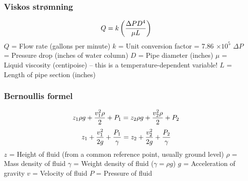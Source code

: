\documentclass{beamer}
\begin{document}
\begin{frame}
	\frametitle{Viskos strømning}

	


%
%
$$Q = k \left({{\Delta P D^4} \over {\mu L}}\right)$$
%
%
$Q$ = Flow rate (gallons per minute)
%
$k$ = Unit conversion factor = 7.86 $\times 10^5$
%
$\Delta P$ = Pressure drop (inches of water column)
%
$D$ = Pipe diameter (inches)
%
$\mu$ = Liquid viscosity (centipoise) -- this is a temperature-dependent variable!
%
$L$ = Length of pipe section (inches)
%
\end{frame}
%
%
%
%
%
%
\begin{frame}
	\frametitle{Bernoullis formel}

	


%
%
%
$$z_1 \rho g + {v_1^2 \rho \over 2} + P_1 = z_2 \rho g + {v_2^2 \rho \over 2} + P_2$$
%
$$z_1 + {v_1^2 \over {2 g}} + {P_1 \over \gamma} = z_2 + {v_2^2 \over {2 g}} + {P_2 \over \gamma}$$
%
%
$z$ = Height of fluid (from a common reference point, usually ground level)
%
$\rho$ = Mass density of fluid
%
$\gamma$ = Weight density of fluid ($\gamma = \rho g$)
%
$g$ = Acceleration of gravity
%
$v$ = Velocity of fluid
%
$P$ = Pressure of fluid
%
\end{frame}
\end{document}
